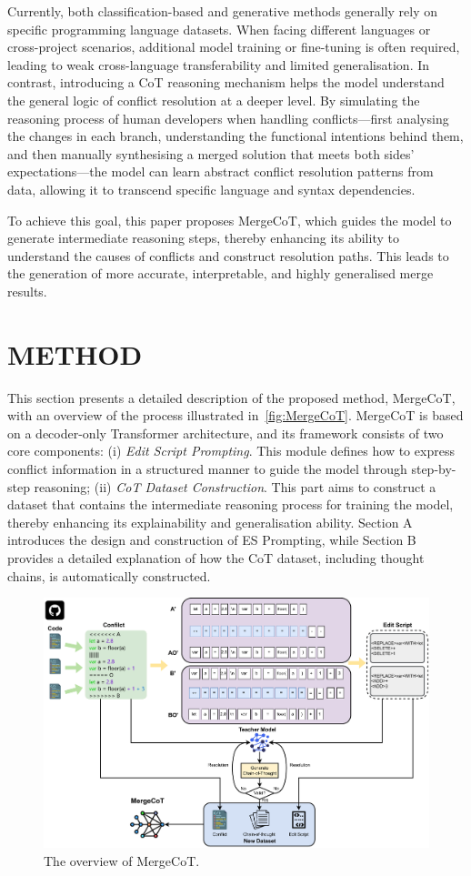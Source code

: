 \documentclass[sigconf,review,anonymous]{acmart}
\begin{document}
Currently, both classification-based and generative methods generally rely on specific programming language datasets. When facing different languages or cross-project scenarios, additional model training or fine-tuning is often required, leading to weak cross-language transferability and limited generalisation. 
In contrast, introducing a CoT reasoning mechanism helps the model understand the general logic of conflict resolution at a deeper level. By simulating the reasoning process of human developers when handling conflicts—first analysing the changes in each branch, understanding the functional intentions behind them, and then manually synthesising a merged solution that meets both sides’ expectations—the model can learn abstract conflict resolution patterns from data, allowing it to transcend specific language and syntax dependencies.

To achieve this goal, this paper proposes MergeCoT, which guides the model to generate intermediate reasoning steps, thereby enhancing its ability to understand the causes of conflicts and construct resolution paths. 
This leads to the generation of more accurate, interpretable, and highly generalised merge results.

\section{METHOD}
This section presents a detailed description of the proposed method, MergeCoT, with an overview of the process illustrated in~\autoref{fig:MergeCoT}.
MergeCoT is based on a decoder-only Transformer architecture, and its framework consists of two core components: (i) \textit{Edit Script Prompting}. This module defines how to express conflict information in a structured manner to guide the model through step-by-step reasoning; (ii) \textit{CoT Dataset Construction}. This part aims to construct a dataset that contains the intermediate reasoning process for training the model, thereby enhancing its explainability and generalisation ability. Section A introduces the design and construction of ES Prompting, while Section B provides a detailed explanation of how the CoT dataset, including thought chains, is automatically constructed.
\begin{figure}[t]
    \centering
    \includegraphics[width=1\linewidth]{Figures/MergeCoT.pdf}
    \caption{The overview of MergeCoT.}
    \label{fig:MergeCoT}
\end{figure}
\end{document}
